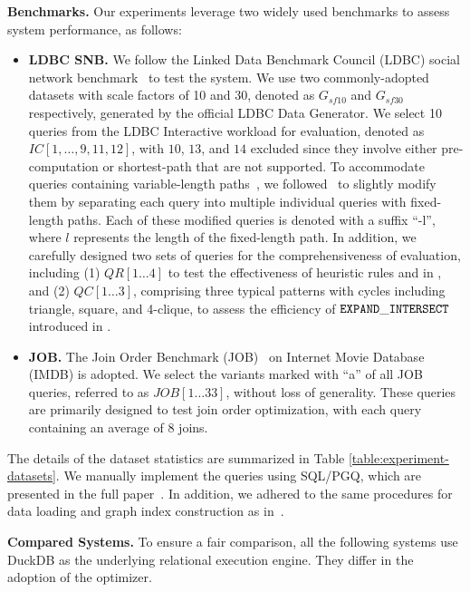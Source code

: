 \noindent\textbf{Benchmarks.} Our experiments leverage two widely used benchmarks to assess system performance, as follows:
\begin{itemize}
    \item \textbf{LDBC SNB.} We follow the Linked Data Benchmark Council (LDBC) social network benchmark~\cite{ldbc_snb} to test the system. We use two commonly-adopted datasets with scale factors of 10 and 30, denoted as $G_{sf10}$ and $G_{sf30}$ respectively, generated by the official LDBC Data Generator.
    We select 10 queries from the LDBC Interactive workload for evaluation, denoted as $IC[1, \ldots, 9, 11, 12]$, with $10$, $13$, and $14$ excluded since they involve either pre-computation or shortest-path that are not supported.
    To accommodate queries containing variable-length paths~\cite{graindb}, we followed~\cite{graindb} to slightly modify them by separating each query into multiple individual queries with fixed-length paths. Each of these modified queries is denoted with a suffix ``-l'', where $l$ represents the length of the fixed-length path. In addition, we carefully designed two sets of queries for the comprehensiveness of evaluation, including (1) $QR[1\ldots 4]$ to test the effectiveness of heuristic rules \filterrule and \joinfuserule in \name, and (2) $QC[1\ldots 3]$, comprising three typical patterns with cycles including triangle, square, and 4-clique, to assess the efficiency of $\texttt{EXPAND}\_\texttt{INTERSECT}$ introduced in .
    \item \textbf{JOB.} The Join Order Benchmark (JOB)~\cite{job_snb} on Internet Movie Database (IMDB) is adopted. We select the variants marked with ``a'' of all JOB queries, referred to as $JOB[1\ldots 33]$, without loss of generality. These queries are primarily designed to test join order optimization, with each query containing an average of $8$ joins.
\end{itemize}
The details of the dataset statistics are summarized in Table \ref{table:experiment-datasets}.
We manually implement the queries using SQL/PGQ, which are presented in the full paper~\cite{full-paper}.
In addition, we adhered to the same procedures for data loading and graph index construction as in~\cite{graindb}.

\noindent\textbf{Compared Systems. }
To ensure a fair comparison, all the following systems use DuckDB as the underlying relational execution engine. They differ in the adoption of the optimizer.


